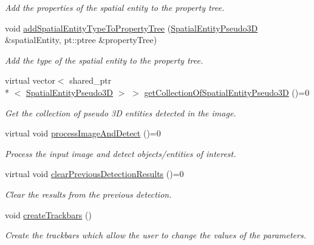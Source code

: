 \begin{DoxyCompactItemize}
\begin{DoxyCompactList}\small\item\em Add the properties of the spatial entity to the property tree. \end{DoxyCompactList}\item 
void \hyperlink{classmultiscale_1_1analysis_1_1Detector_ae166867e5af40637dbde9ac0da6dac9a}{add\-Spatial\-Entity\-Type\-To\-Property\-Tree} (\hyperlink{classmultiscale_1_1analysis_1_1SpatialEntityPseudo3D}{Spatial\-Entity\-Pseudo3\-D} \&spatial\-Entity, pt\-::ptree \&property\-Tree)
\begin{DoxyCompactList}\small\item\em Add the type of the spatial entity to the property tree. \end{DoxyCompactList}\item 
virtual vector$<$ shared\-\_\-ptr\\*
$<$ \hyperlink{classmultiscale_1_1analysis_1_1SpatialEntityPseudo3D}{Spatial\-Entity\-Pseudo3\-D} $>$ $>$ \hyperlink{classmultiscale_1_1analysis_1_1Detector_a684a7071aca4173e3dc968d8635bd92a}{get\-Collection\-Of\-Spatial\-Entity\-Pseudo3\-D} ()=0
\begin{DoxyCompactList}\small\item\em Get the collection of pseudo 3\-D entities detected in the image. \end{DoxyCompactList}\item 
virtual void \hyperlink{classmultiscale_1_1analysis_1_1Detector_a7451855e415300f15765082f21588f13}{process\-Image\-And\-Detect} ()=0
\begin{DoxyCompactList}\small\item\em Process the input image and detect objects/entities of interest. \end{DoxyCompactList}\item 
virtual void \hyperlink{classmultiscale_1_1analysis_1_1Detector_a3c2add35193ad09a0200003d0053da6b}{clear\-Previous\-Detection\-Results} ()=0
\begin{DoxyCompactList}\small\item\em Clear the results from the previous detection. \end{DoxyCompactList}\item 
void \hyperlink{classmultiscale_1_1analysis_1_1Detector_a3d406aaa4dc8e9f8adbee3d7818cf1de}{create\-Trackbars} ()
\begin{DoxyCompactList}\small\item\em Create the trackbars which allow the user to change the values of the parameters. \end{DoxyCompactList}\item 

\end{DoxyCompactItemize}
